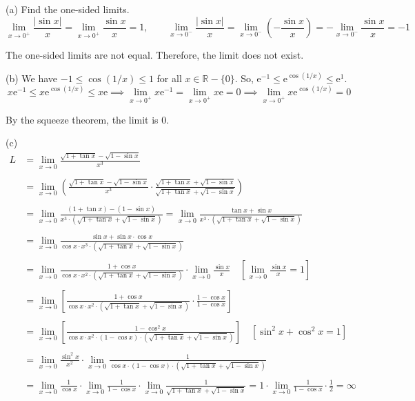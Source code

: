 \documentclass{article}
\begin{document}
\hfill

\noindent (a) Find the one-sided limits.
\[\lim_{x\to 0^+} \frac{\left|\sin x\right|}{x}=\lim_{x\to 0^+}\frac{\sin x}{x}=1,\quad\quad \lim_{x\to 0^-} \frac{\left|\sin x\right|}{x}=\lim_{x\to0^-}\left(-\frac{\sin x}{x}\right)=-\lim_{x\to0^-}\frac{\sin x}{x}=-1\]

\hfill

\noindent The one-sided limits are not equal. Therefore, the limit does not exist.

\hfill

\noindent (b) We have $-1\leq\cos(1/x)\leq1$ for all $x\in\mathbb R-\{0\}$. So, $\mathrm{e}^{-1}\leq\mathrm{e}^{\cos(1/x)}\leq\mathrm{e}^1$.
\[x\mathrm{e}^{-1}\leq x\mathrm{e}^{\cos(1/x)}\leq x\mathrm{e}\implies\lim_{x\to0^+} x\mathrm{e}^{-1}=\lim_{x\to0^+}x\mathrm{e}=0\implies\lim_{x\to0^+}x\mathrm{e}^{\cos(1/x)}=\boxed0\]

\noindent By the squeeze theorem, the limit is 0.

\hfill

\noindent (c)
\begin{align*}L&=\displaystyle\lim_{x\to0}\frac{\sqrt{1+\tan x}-\sqrt{1-\sin x}}{x^3}
\\\\&=\lim_{x\to0}\left(\frac{\sqrt{1+\tan x}-\sqrt{1-\sin x}}{x^3}\cdot\frac{\sqrt{1+\tan x}+\sqrt{1-\sin x}}{\sqrt{1+\tan x}+\sqrt{1-\sin x}}\right)\\\\&=\lim_{x\to0}\frac{(1+\tan x)-(1-\sin x)}{x^3\cdot\left(\sqrt{1+\tan x}+\sqrt{1-\sin x}\right)}=\lim_{x\to0}\frac{\tan x+\sin x}{x^3\cdot\left(\sqrt{1+\tan x}+\sqrt{1-\sin x}\right)}\\\\&=\lim_{x\to0}\frac{\sin x+\sin x\cdot\cos x}{\cos x\cdot x^3\cdot\left(\sqrt{1+\tan x}+\sqrt{1-\sin x}\right)}\\\\&=\lim_{x\to0}\frac{1+\cos x}{\cos x\cdot x^2\cdot\left(\sqrt{1+\tan x}+\sqrt{1-\sin x}\right)}\cdot\lim_{x\to0}\frac{\sin x}{x}\quad\left[\lim_{x\to0}\frac{\sin x}x=1\right]\\\\&=\lim_{x\to0}\left[\frac{1+\cos x}{\cos x\cdot x^2\cdot\left(\sqrt{1+\tan x}+\sqrt{1-\sin x}\right)}\cdot\frac{1-\cos x}{1-\cos x}\right]\\\\&=\lim_{x\to0}\left[\frac{1-\cos^2x}{\cos x\cdot x^2\cdot(1-\cos x)\cdot\left(\sqrt{1+\tan x}+\sqrt{1-\sin x}\right)}\right]\quad\left[\sin^2x+\cos^2x=1\right]\\\\&=\lim_{x\to0}\frac{\sin^2x}{x^2}\cdot\lim_{x\to0}\frac1{\cos x\cdot(1-\cos x)\cdot\left(\sqrt{1+\tan x}+\sqrt{1-\sin x}\right)}\\\\&=\lim_{x\to0}\frac1{\cos x}\cdot\lim_{x\to0}\frac1{1-\cos x}\cdot\lim_{x\to0}\frac1{\sqrt{1+\tan x}+\sqrt{1-\sin x}}=1\cdot\lim_{x\to0}\frac1{1-\cos x}\cdot\frac12 =\boxed{\infty}\end{align*}
\end{document}
